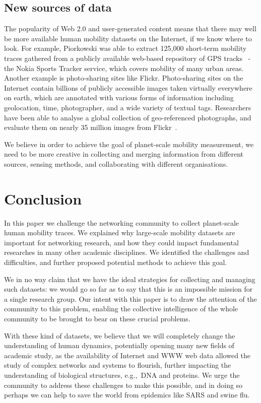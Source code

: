 \documentclass{sig-alternate-10pt}
\begin{document}
\subsection{New sources of data}
\vspace{-1mm}
The popularity of Web 2.0 and user-generated content means that there
may well be more available human mobility datasets on the Internet, if
we know where to look.
For example,
Piorkowski was able to extract
125,000 short-term mobility traces gathered from a publicly available
web-based repository of GPS tracks~\cite{Piorkowski:hotplanet} - the Nokia Sports Tracker service, which covers mobility of many urban areas. Another example is photo-sharing sites like Flickr. Photo-sharing sites on the Internet contain billions of publicly accessible
images taken virtually everywhere on earth, which are annotated with various forms of information including geolocation, time, photographer, and a wide variety of textual tags. Researchers have been able to analyse a global collection of geo-referenced photographs, and evaluate them on nearly 35 million images from Flickr~\cite{crandall09:flickr}.

We believe in order to achieve the goal of planet-scale mobility
measurement, we need to be more creative in collecting and merging
information from different sources, sensing methods, and collaborating with different organisations.
\vspace{-2mm}
\section{Conclusion}
\vspace{-2mm}
In this paper we challenge the networking community to collect
planet-scale human mobility traces. We explained why large-scale
mobility datasets are important for networking research, and how they
could impact fundamental researches in many other academic
disciplines. We identified the challenges and difficulties, and
further proposed potential methods to achieve this goal.

We in no way claim that we have the ideal strategies for collecting
and managing such datasets: we would go so far as to say that this is
an impossible mission for a single research group. Our intent with
this paper is to draw the attention of the community to this problem,
enabling the collective intelligence of the whole community to be
brought to bear on these crucial problems.

With these kind of datasets, we believe that we will completely change
the understanding of human dynamics, potentially opening many new
fields of academic study, as the availability of Internet and WWW web
data allowed the study of complex networks and systems to flourish,
further impacting the understanding of biological structures,
e.g.,~DNA and proteins.  We urge the community to address these
challenges to make this possible, and in doing so perhaps we can help
to save the world from epidemics like SARS and swine flu.



\end{document}
